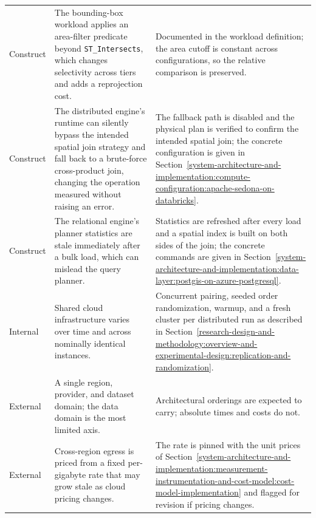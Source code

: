 \begin{longtable}{@{\extracolsep{\fill}}l p{} p{}@{}}
	\addlinespace
	Construct & The bounding-box workload applies an area-filter predicate beyond \texttt{ST\_Intersects}, which changes selectivity across tiers and adds a reprojection cost. & Documented in the workload definition; the area cutoff is constant across configurations, so the relative comparison is preserved. \\
	\addlinespace
	Construct & The distributed engine's runtime can silently bypass the intended spatial join strategy and fall back to a brute-force cross-product join, changing the operation measured without raising an error. & The fallback path is disabled and the physical plan is verified to confirm the intended spatial join; the concrete configuration is given in Section~\ref{system-architecture-and-implementation:compute-configuration:apache-sedona-on-databricks}. \\
	\addlinespace
	Construct & The relational engine's planner statistics are stale immediately after a bulk load, which can mislead the query planner. & Statistics are refreshed after every load and a spatial index is built on both sides of the join; the concrete commands are given in Section~\ref{system-architecture-and-implementation:data-layer:postgis-on-azure-postgresql}. \\
	\addlinespace
	Internal & Shared cloud infrastructure varies over time and across nominally identical instances. & Concurrent pairing, seeded order randomization, warmup, and a fresh cluster per distributed run as described in Section~\ref{research-design-and-methodology:overview-and-experimental-design:replication-and-randomization}. \\
	\addlinespace
	External & A single region, provider, and dataset domain; the data domain is the most limited axis. & Architectural orderings are expected to carry; absolute times and costs do not. \\
	\addlinespace
	External & Cross-region egress is priced from a fixed per-gigabyte rate that may grow stale as cloud pricing changes. & The rate is pinned with the unit prices of Section~\ref{system-architecture-and-implementation:measurement-instrumentation-and-cost-model:cost-model-implementation} and flagged for revision if pricing changes. \\
\end{longtable}

